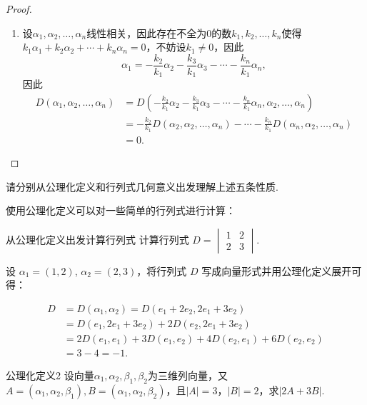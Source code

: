 \begin{proof}
\begin{enumerate}
        \item 设$\alpha_1,\alpha_2,\ldots,\alpha_n$线性相关，因此存在不全为0的数$k_1,k_2,\ldots,k_n$使得$k_1\alpha_1+k_2\alpha_2+\cdots+k_n\alpha_n=0$，不妨设$k_1 \neq 0$，因此
              \[\alpha_1=-\frac{k_2}{k_1}\alpha_2-\frac{k_3}{k_1}\alpha_3-\cdots-\frac{k_n}{k_1}\alpha_n,\]
              因此
              \begin{align*}
                  D(\alpha_1,\alpha_2,\ldots,\alpha_n) & =D(-\frac{k_2}{k_1}\alpha_2-\frac{k_3}{k_1}\alpha_3-\cdots-\frac{k_n}{k_1}\alpha_n,\alpha_2,\ldots,\alpha_n)     \\
                                                       & =-\frac{k_2}{k_1}D(\alpha_2,\alpha_2,\ldots,\alpha_n)-\cdots-\frac{k_n}{k_1}D(\alpha_n,\alpha_2,\ldots,\alpha_n) \\
                                                       & =0.
              \end{align*}
    \end{enumerate}
\end{proof}

请分别从公理化定义和行列式几何意义出发理解上述五条性质.

使用公理化定义可以对一些简单的行列式进行计算：

\begin{example}{}{从公理化定义出发计算行列式}
    计算行列式 $D = \begin{vmatrix}
        1 & 2 \\
        2 & 3
    \end{vmatrix}$.
\end{example}

\begin{solution}
    设 $\alpha_1 = (1, 2)$, $\alpha_2 = (2, 3)$，将行列式 $D$ 写成向量形式并用公理化定义展开可得：

    \begin{align*}
        D &= D(\alpha_1, \alpha_2) = D(e_1 + 2e_2, 2e_1 + 3e_2) \\
          &= D(e_1, 2e_1 + 3e_2) + 2 D(e_2, 2e_1 + 3e_2) \\
          &= 2D(e_1, e_1) + 3D(e_1, e_2) + 4D(e_2, e_1) + 6D(e_2, e_2) \\
          &= 3 - 4 = -1.
    \end{align*}
\end{solution}

\begin{example}{}{公理化定义2}
    设向量$\alpha_1,\alpha_2,\beta_1,\beta_2$为三维列向量，又$A=(\alpha_1,\alpha_2,\beta_1),B=(\alpha_1,\alpha_2,\beta_2)$，且$|A|=3$，$|B|=2$，求$|2A+3B|$.
\end{example}

